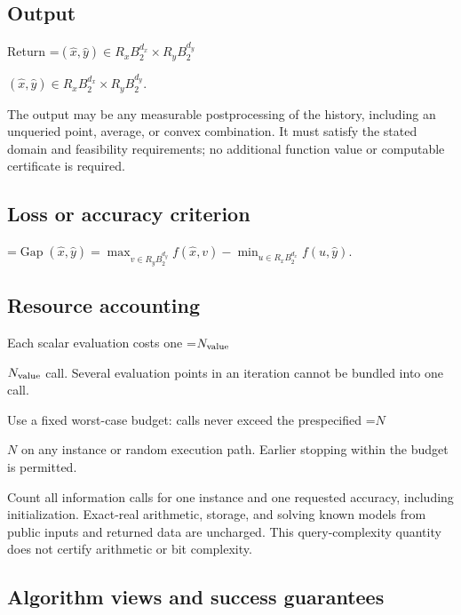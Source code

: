 \documentclass[10pt,a4paper]{article}
\newcommand{\AtlasMath}[1]{\par\begingroup\centering\setbox0=\hbox{$\displaystyle #1$}\ifdim\wd0>1.4\linewidth\typeout{ATLAS WIDE FORMULA: \the\wd0}\fi\ifdim\wd0>\linewidth\resizebox{\linewidth}{!}{\box0}\else\box0\fi\par\endgroup}
\newcommand{\AtlasInlineMath}[1]{\begingroup\setbox0=\hbox{$#1$}\ifdim\wd0>.4\linewidth\endgroup\AtlasMath{#1}\else\endgroup$#1$\fi}
\begin{document}
\subsection{Output}


Return \AtlasInlineMath{(\widehat{x},\widehat{y})\in R_xB_2^{d_x}\times R_yB_2^{d_y}}.



The output may be any measurable postprocessing of the history, including an unqueried point, average, or convex combination. It must satisfy the stated domain and feasibility requirements; no additional function value or computable certificate is required.



\subsection{Loss or accuracy criterion}



\AtlasMath{\operatorname{Gap}(\widehat{x},\widehat{y})=\max_{v\in R_yB_2^{d_y}}f(\widehat{x},v)-\min_{u\in R_xB_2^{d_x}}f(u,\widehat{y}).}




\subsection{Resource accounting}


Each scalar evaluation costs one \AtlasInlineMath{N_{\rm value}} call. Several evaluation points in an iteration cannot be bundled into one call.



Use a fixed worst-case budget: calls never exceed the prespecified \AtlasInlineMath{N} on any instance or random execution path. Earlier stopping within the budget is permitted.



Count all information calls for one instance and one requested accuracy, including initialization. Exact-real arithmetic, storage, and solving known models from public inputs and returned data are uncharged. This query-complexity quantity does not certify arithmetic or bit complexity.



\subsection{Algorithm views and success guarantees}
\end{document}
